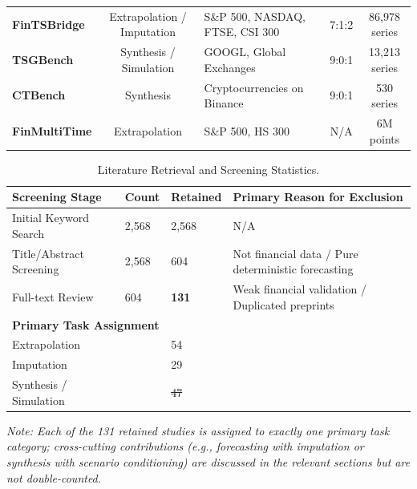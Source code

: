 \documentclass[11pt,a4paper]{article}
\makeatletter
\providecommand{\DIFaddtex}[1]{{\protect\color{blue}\uwave{#1}}} %
\providecommand{\DIFdeltex}[1]{{\protect\color{red}\sout{#1}}} %
\providecommand{\DIFaddFL}[1]{\DIFadd{#1}} %
\providecommand{\DIFdelFL}[1]{\DIFdel{#1}} %
\providecommand{\DIFaddbeginFL}{} %
\providecommand{\DIFaddendFL}{} %
\providecommand{\DIFdelbeginFL}{} %
\providecommand{\DIFdelendFL}{} %
\providecommand{\DIFadd}[1]{\texorpdfstring{\DIFaddtex{#1}}{#1}} %
\providecommand{\DIFdel}[1]{\texorpdfstring{\DIFdeltex{#1}}{}} %
\providecommand{\DIFscaledelfig}{0.5}
\newlength{\DIFdelgraphicswidth} %
\newlength{\DIFdelgraphicsheight} %
\providecommand{\DIFaddincludegraphics}[2][]{{\color{blue}\fbox{\DIFOincludegraphics[#1]{#2}}}} %
\providecommand{\DIFdelincludegraphics}[2][]{%
\sbox{\DIFdelgraphicsbox}{\DIFOincludegraphics[#1]{#2}}%
\settoboxwidth{\DIFdelgraphicswidth}{\DIFdelgraphicsbox} %
\settoboxtotalheight{\DIFdelgraphicsheight}{\DIFdelgraphicsbox} %
\scalebox{\DIFscaledelfig}{%
\parbox[b]{\DIFdelgraphicswidth}{\usebox{\DIFdelgraphicsbox}\\[-\baselineskip] \rule{\DIFdelgraphicswidth}{0em}}\llap{\resizebox{\DIFdelgraphicswidth}{\DIFdelgraphicsheight}{%
\setlength{\unitlength}{\DIFdelgraphicswidth}%
\begin{picture}(1,1)%
\thicklines\linethickness{2pt} %
{\color[rgb]{1,0,0}\put(0,0){\framebox(1,1){}}}%
{\color[rgb]{1,0,0}\put(0,0){\line( 1,1){1}}}%
{\color[rgb]{1,0,0}\put(0,1){\line(1,-1){1}}}%
\end{picture}%
}\hspace*{3pt}}} %
} %
\DeclareRobustCommand{\DIFaddbeginFL}{\DIFOaddbeginFL \let\includegraphics\DIFaddincludegraphics} %
\DeclareRobustCommand{\DIFaddendFL}{\DIFOaddendFL \let\includegraphics\DIFOincludegraphics} %
\DeclareRobustCommand{\DIFdelbeginFL}{\DIFOdelbeginFL \let\includegraphics\DIFdelincludegraphics} %
\DeclareRobustCommand{\DIFdelendFL}{\DIFOaddendFL \let\includegraphics\DIFOincludegraphics} %
\let\sout@orig\sout %
\renewcommand{\sout}[1]{\ifmmode\text{\sout@orig{\ensuremath{#1}}}\else\sout@orig{#1}\fi} %
\makeatother
\begin{document}
\begin{table}[!ht]
{\begin{tabular}{p{3.5cm} c p{4.5cm} c c}
\rowcolor{gray!10}
\textbf{FinTSBridge} \citep{wang2025fintsbridge} & Extrapolation / Imputation & S\&P 500, NASDAQ, FTSE, CSI 300 & 7:1:2 & 86,978 series \\
\textbf{TSGBench} \citep{ang2023tsgbench} & Synthesis / Simulation & GOOGL, Global Exchanges & 9:0:1 & 13,213 series \\
\textbf{CTBench} \citep{ang2025ctbench} & Synthesis & Cryptocurrencies on Binance & 9:0:1 & 530 series \\
\textbf{FinMultiTime} \citep{FinMultiTime} & Extrapolation & S\&P 500, HS 300 & N/A & 6M points \\
\bottomrule
\end{tabular}%
}
\DIFaddendFL \end{table}

\vspace{2em}

\begin{table}[!ht]
\centering
\scriptsize
\caption{Literature Retrieval and Screening Statistics.}
\label{tab:retrieval_stats}
\begin{tabular}{p{5cm} p{2cm} p{2cm} p{3cm}}
\toprule
\textbf{Screening Stage} & \textbf{Count} & \textbf{Retained} & \textbf{Primary Reason for Exclusion} \\
\midrule
Initial Keyword Search & 2,568 & 2,568 & N/A \\
Title/Abstract Screening & 2,568 & 604 & Not financial data / Pure deterministic forecasting \\
Full-text Review & 604 & \textbf{131} & Weak financial validation / Duplicated preprints \\
\midrule
\multicolumn{4}{l}{\textbf{Primary Task Assignment}} \\
\quad Extrapolation & & 54 & \\
\quad Imputation & & 29 & \\
\quad Synthesis / Simulation & & \DIFdelbeginFL \DIFdelFL{47 }\DIFdelendFL \DIFaddbeginFL \DIFaddFL{48 }\DIFaddendFL & \\
\bottomrule
\end{tabular}
\begin{flushleft}
\textit{Note: Each of the 131 retained studies is assigned to exactly one primary task category; cross-cutting contributions (e.g., forecasting with imputation or synthesis with scenario conditioning) are discussed in the relevant sections but are not double-counted.}
\end{flushleft}
\end{table}
\end{document}
